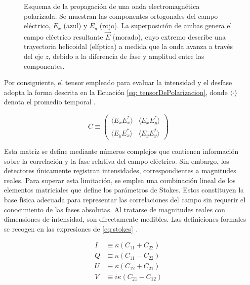 \begin{figure}[H]
    \caption{Esquema de la propagación de una onda electromagnética polarizada. Se muestran las componentes ortogonales del campo eléctrico, $E_x$ (azul) y $E_y$ (rojo). La superposición de ambas genera el campo eléctrico resultante $\vec{E}$ (morado), cuyo extremo describe una trayectoria helicoidal (elíptica) a medida que la onda avanza a través del eje $z$, debido a la diferencia de fase y amplitud entre las componentes.}
    \label{fig:componentes_em}
\end{figure}

Por consiguiente, el tensor empleado para evaluar la intensidad y el desfase adopta la forma descrita en la Ecuación \ref{eq: tensorDePolarizacion}, donde $\langle \cdot \rangle$ denota el promedio temporal \cite[cap. 2.3]{toroiniestaIntroductionSpectropolarimetry2003}.

\begin{equation}
    \label{eq: tensorDePolarizacion}
    C \equiv \begin{pmatrix} \langle E_x E_x^* \rangle & \langle E_x E_y^* \rangle \\ \langle E_y E_x^* \rangle & \langle E_y E_y^* \rangle \end{pmatrix}
\end{equation}

Esta matriz se define mediante números complejos que contienen información sobre la correlación y la fase relativa del campo eléctrico. Sin embargo, los detectores únicamente registran intensidades, correspondientes a magnitudes reales. Para superar esta limitación, se emplea una combinación lineal de los elementos matriciales que define los parámetros de Stokes. Estos constituyen la base física adecuada para representar las correlaciones del campo sin requerir el conocimiento de las fases absolutas. Al tratarse de magnitudes reales con dimensiones de intensidad, son directamente medibles. Las definiciones formales se recogen en las expresiones de \ref{eq:stokes} \cite[cap. 2.4]{toroiniestaIntroductionSpectropolarimetry2003}.

\begin{equation}
    \label{eq:stokes}
    \begin{aligned}
        I &\equiv \kappa (C_{11} + C_{22}) \\
        Q &\equiv \kappa (C_{11} - C_{22}) \\
        U &\equiv \kappa (C_{12} + C_{21}) \\
        V &\equiv i\kappa (C_{21} - C_{12})
    \end{aligned}
\end{equation}


